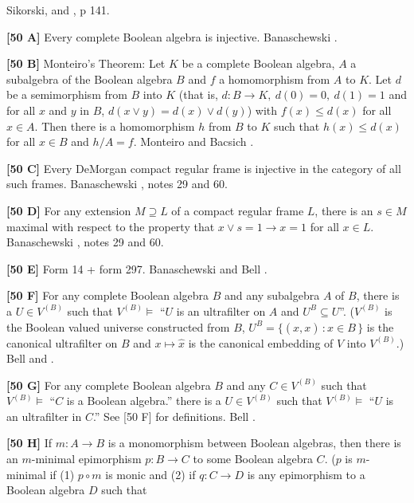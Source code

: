 \ac{Sikorski}\cite{1950}, \cite{1960} and \cite{1964}, p 141.
\smallskip
\item{}{\bf [50 A]}  Every complete Boolean algebra is injective.
\ac{Banaschewski} \cite{1988}.
\smallskip
\item{}{\bf [50 B]}  Monteiro's Theorem:  Let $K$ be a complete Boolean
algebra, $A$ a subalgebra of the Boolean algebra $B$ and $f$ a
homomorphism from $A$ to $K$. Let $d$ be a semimorphism from $B$ into
$K$ (that is, $d: B\to K,\ d(0)=0,\ d(1)=1$ and for all $x$ and $y$ in
$B$, $d(x\lor y)=d(x)\lor d(y)$) with $f(x)\le d(x)$ for all $x\in A$.
Then there is a homomorphism $h$ from $B$ to $K$ such that $h(x)\le d(x)$
for all $x \in B$ and $h/A = f$.  \ac{Monteiro} \cite{1965} and \ac{Bacsich}
\cite{1972a}.  
\smallskip
\item{}{\bf [50 C]} Every DeMorgan compact regular frame is injective in
the category of all such frames.  \ac{Banaschewski} \cite{1988}, notes 29
and 60.
\smallskip
\item{}{\bf [50 D]} For any extension $M \supseteq L$ of a compact regular
frame $L$, there is an $s\in M$ maximal with respect to the property that
$x\lor s =1 \to x=1$ for all $x\in L$.  \ac{Banaschewski} \cite{1988},
notes 29 and 60.
\smallskip
\item{}{\bf [50 E]}  Form 14 + form 297. \ac{Banaschewski} \cite{1988} and
\ac{Bell} \cite{1988}.
\smallskip
\item{}{\bf [50 F]} For any complete Boolean algebra $B$ and any subalgebra
$A$ of $B$, there is a $U \in V^{(B)}$ such that $V^{(B)}\models$
``$U$ is an ultrafilter on $A$ and $U^B \subseteq U$''.  ($V^{(B)}$ is
the Boolean valued universe constructed from $B$, $U^B = \{ (\hat x,x)
\, : x\in B\,\}$ is the canonical ultrafilter on $B$ and $x\mapsto\hat x$
is the canonical embedding of $V$ into $V^{(B)}$.)  \ac{Bell} \cite{1977}
and \cite{1983}.
\smallskip
\item{}{\bf [50 G]}  For any complete Boolean algebra $B$ and
any $C\in V^{(B)}$ such that $V^{(B)}\models$ ``$C$ is a Boolean algebra.''
there is a $U\in V^{(B)}$ such that $V^{(B)}\models $ ``$U$ is an
ultrafilter in $C$.''  See [50 F] for definitions.  \ac{Bell} \cite{1983}.
\smallskip
\item{}{\bf [50 H]} If $m: A\to B$ is a monomorphism between Boolean
algebras, then there is an $m$-minimal epimorphism $p: B\to C$ to some
Boolean algebra $C$.  ($p$ is $m$-minimal if (1) $p\circ m$ is monic and
(2) if $q:C\to D$ is any epimorphism to a Boolean algebra $D$ such that
